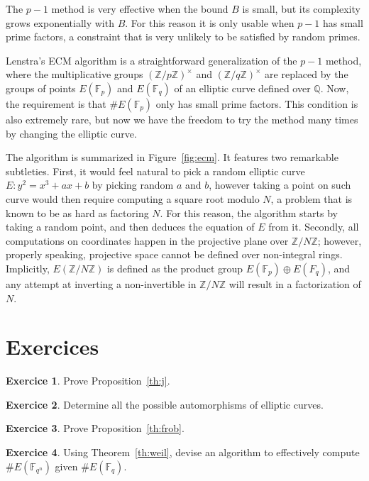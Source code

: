 \documentclass[10pt]{article}
\theoremstyle{plain}
\theoremstyle{definition}
\newtheorem{exercice}{Exercice}[part]
\def\F{\ensuremath{\mathbb{F}}}
\begin{document}
The $p-1$ method is very effective when the bound $B$ is small, but
its complexity grows exponentially with $B$. %
For this reason it is only usable when $p-1$ has small prime factors,
a constraint that is very unlikely to be satisfied by random primes.

Lenstra's ECM algorithm is a straightforward generalization of the
$p-1$ method, where the multiplicative groups $(ℤ/pℤ)^{×}$ and
$(ℤ/qℤ)^{×}$ are replaced by the groups of points $E(\F_p)$ and
$E(\F_q)$ of an elliptic curve defined over $ℚ$. %
Now, the requirement is that $\#E(\F_p)$ only has small prime
factors. %
This condition is also extremely rare, but now we have the freedom to
try the method many times by changing the elliptic curve. %

The algorithm is summarized in Figure~\ref{fig:ecm}. %
It features two remarkable subtleties. %
First, it would feel natural to pick a random elliptic curve
$E:y^2=x^3+ax+b$ by picking random $a$ and $b$, however taking a point
on such curve would then require computing a square root modulo $N$, a
problem that is known to be as hard as factoring $N$. %
For this reason, the algorithm starts by taking a random point, and
then deduces the equation of $E$ from it. %
Secondly, all computations on coordinates happen in the projective
plane over $ℤ/Nℤ$; however, properly speaking, projective space cannot
be defined over non-integral rings. %
Implicitly, $E(ℤ/Nℤ)$ is defined as the product group
$E(\F_p)⊕E(F_q)$, and any attempt at inverting a non-invertible in
$ℤ/Nℤ$ will result in a factorization of $N$.

\section*{Exercices}

\begin{exercice}
  Prove Proposition~\ref{th:j}.
\end{exercice}

\begin{exercice}
  Determine all the possible automorphisms of elliptic curves.
\end{exercice}

\begin{exercice}
  Prove Proposition~\ref{th:frob}.
\end{exercice}

\begin{exercice}
  Using Theorem~\ref{th:weil}, devise an algorithm to effectively
  compute $\#E(\F_{q^n})$ given $\#E(\F_q)$.
\end{exercice}
\end{document}
